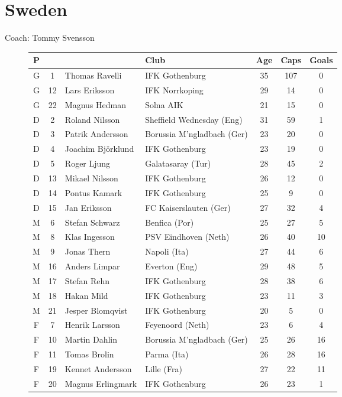 \chapter{Sweden}
\newline
\newline
Coach: Tommy Svensson
\begin{figure}[H]
\begin{tabular}{c c l l c c c}
P & & & Club & Age & Caps & Goals \\ \hline
G & 1 & Thomas Ravelli & IFK Gothenburg & 35 & 107 & 0 \\
G & 12 & Lars Eriksson & IFK Norrkoping & 29 & 14 & 0 \\
G & 22 & Magnus Hedman & Solna AIK & 21 & 15 & 0 \\ \hline
D & 2 & Roland Nilsson & Sheffield Wednesday (Eng) & 31 & 59 & 1 \\
D & 3 & Patrik Andersson & Borussia M'ngladbach (Ger) & 23 & 20 & 0 \\
D & 4 & Joachim Bj{\"o}rklund & IFK Gothenburg & 23 & 19 & 0 \\
D & 5 & Roger Ljung & Galatasaray (Tur) & 28 & 45 & 2 \\
D &13 & Mikael Nilsson & IFK Gothenburg & 26 & 12 & 0 \\
D &14 & Pontus Kamark & IFK Gothenburg & 25 & 9 & 0 \\
D &15 & Jan Eriksson & FC Kaiserslauten (Ger) & 27 & 32 & 4 \\ \hline
M & 6 & Stefan Schwarz & Benfica (Por) & 25 & 27 & 5 \\
M & 8 & Klas Ingesson & PSV Eindhoven (Neth) & 26 & 40 & 10 \\
M & 9 & Jonas Thern & Napoli (Ita) & 27 & 44 & 6 \\
M & 16 & Anders Limpar & Everton (Eng) & 29 & 48 & 5 \\
M & 17 & Stefan Rehn & IFK Gothenburg & 28 & 38 & 6 \\
M & 18 & Hakan Mild & IFK Gothenburg & 23 & 11 & 3 \\
M & 21 & Jesper Blomqvist & IFK Gothenburg & 20 & 5 & 0 \\ \hline
F & 7 & Henrik Larsson & Feyenoord (Neth) & 23 & 6 & 4 \\
F & 10 & Martin Dahlin & Borussia M'ngladbach (Ger) & 25 & 26 & 16 \\
F & 11 & Tomas Brolin & Parma (Ita) & 26 & 28 & 16 \\
F & 19 & Kennet Andersson & Lille (Fra) & 27 & 22 & 11 \\
F & 20 & Magnus Erlingmark & IFK Gothenburg & 26 & 23 & 1 \\ \hline
\end{tabular}
\end{figure}
